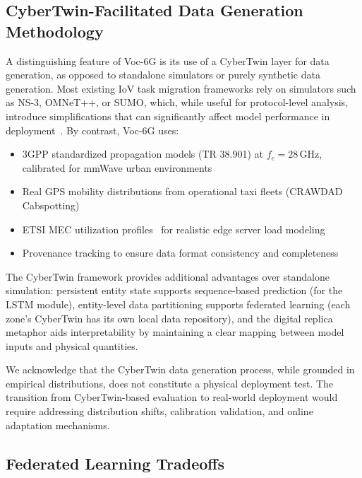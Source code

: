 \documentclass[10pt,letterpaper]{article}
\providecommand{\VocSixG}{Voc-6G}
\begin{document}
\subsection*{CyberTwin-Facilitated Data Generation Methodology}

A distinguishing feature of \VocSixG{} is its use of a CyberTwin layer for data generation, as opposed to standalone simulators or purely synthetic data generation. Most existing IoV task migration frameworks rely on simulators such as NS-3, OMNeT++, or SUMO, which, while useful for protocol-level analysis, introduce simplifications that can significantly affect model performance in deployment~\cite{hou2018mobile}. By contrast, \VocSixG{} uses:

\begin{itemize}
    \item 3GPP standardized propagation models (TR 38.901) at $f_c=28$\,GHz, calibrated for mmWave urban environments
    \item Real GPS mobility distributions from operational taxi fleets (CRAWDAD Cabspotting)
    \item ETSI MEC utilization profiles~\cite{etsi_mec003} for realistic edge server load modeling
    \item Provenance tracking to ensure data format consistency and completeness
\end{itemize}

The CyberTwin framework provides additional advantages over standalone simulation: persistent entity state supports sequence-based prediction (for the LSTM module), entity-level data partitioning supports federated learning (each zone's CyberTwin has its own local data repository), and the digital replica metaphor aids interpretability by maintaining a clear mapping between model inputs and physical quantities.

We acknowledge that the CyberTwin data generation process, while grounded in empirical distributions, does not constitute a physical deployment test. The transition from CyberTwin-based evaluation to real-world deployment would require addressing distribution shifts, calibration validation, and online adaptation mechanisms.

\subsection*{Federated Learning Tradeoffs}
\end{document}
